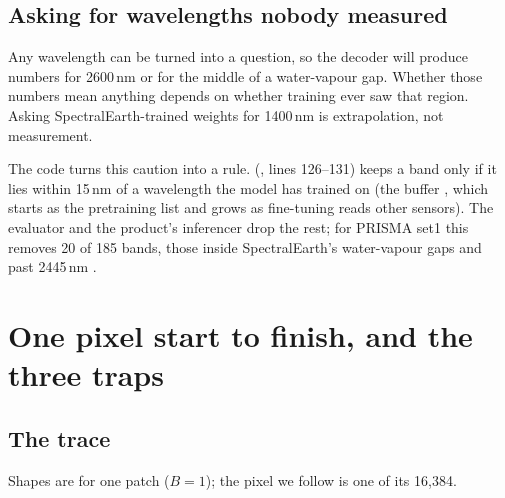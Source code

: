 \subsection{Asking for wavelengths nobody measured}\label{sec:specdecoder:extrap}

Any wavelength can be turned into a question, so the decoder will produce numbers for 2600\,nm or for the middle of a water-vapour gap. Whether those numbers mean anything depends on whether training ever saw that region. Asking SpectralEarth-trained weights for 1400\,nm is extrapolation, not measurement.

\begin{sourcenote}
The code turns this caution into a rule.  (, lines 126--131) keeps a band only if it lies within 15\,nm of a wavelength the model has trained on (the buffer , which starts as the pretraining list and grows as fine-tuning reads other sensors). The evaluator and the product's inferencer drop the rest; for PRISMA set1 this removes 20 of 185 bands, those inside SpectralEarth's water-vapour gaps and past 2445\,nm .
\end{sourcenote}

\section{One pixel start to finish, and the three traps}\label{sec:specdecoder:traps}

\subsection{The trace}

Shapes are for one patch ($B = 1$); the pixel we follow is one of its 16,384.

